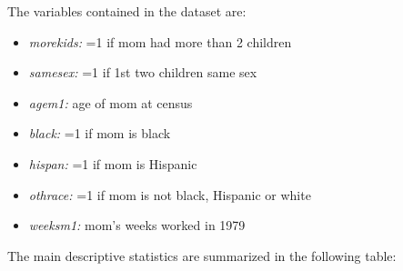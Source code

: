 \documentclass{article}
\begin{document}
The variables contained in the dataset are:
\begin{itemize}
    \item \textit{morekids:}  =1 if mom had more than 2 children
    \item \textit{samesex:} =1 if 1st two children same sex
    \item \textit{agem1:} age of mom at census
    \item \textit{black:} =1 if mom is black
    \item \textit{hispan:} =1 if mom is Hispanic
    \item \textit{othrace:} =1 if mom is not black, Hispanic or white
    \item \textit{weeksm1:}  mom's weeks worked in 1979
\end{itemize}
\vspace{.5cm}
The main descriptive statistics are summarized in the following table:
\end{document}
